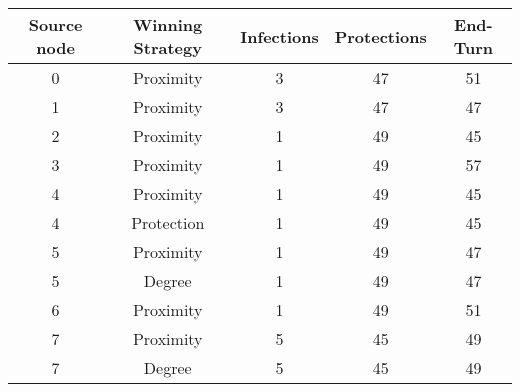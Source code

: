 \documentclass[results.tex]{subfiles}
\begin{document}
    \begin{center}
        \begin{tabular}{| c || c | c | c | c |}
            \hline
            {\bfseries Source node} & {\bfseries Winning Strategy} & {\bfseries Infections} & {\bfseries Protections}
            & {\bfseries End-Turn}
            \\  %
            \hline\hline
            0                       & Proximity                    & 3                      & 47                      & 51                   \\
            \hline
            1                       & Proximity                    & 3                      & 47                      & 47                   \\
            \hline
            2                       & Proximity                    & 1                      & 49                      & 45                   \\
            \hline
            3                       & Proximity                    & 1                      & 49                      & 57                   \\
            \hline
            4                       & Proximity                    & 1                      & 49                      & 45                   \\
            \hline
            4                       & Protection                   & 1                      & 49                      & 45                   \\
            \hline
            5                       & Proximity                    & 1                      & 49                      & 47                   \\
            \hline
            5                       & Degree                       & 1                      & 49                      & 47                   \\
            \hline
            6                       & Proximity                    & 1                      & 49                      & 51                   \\
            \hline
            7                       & Proximity                    & 5                      & 45                      & 49                   \\
            \hline
            7                       & Degree                       & 5                      & 45                      & 49                   \\

\end{tabular}
\end{center}
\end{document}
